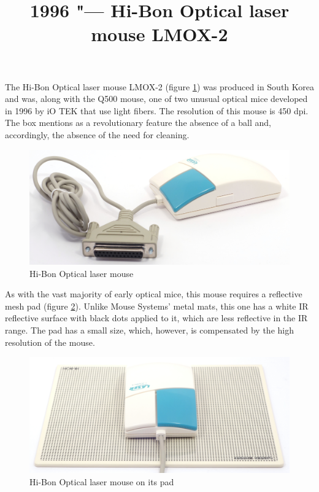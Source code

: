 \documentclass[11pt, a4paper]{article}
\begin{document}
\title{1996 "--- Hi-Bon Optical laser mouse LMOX-2}
\date{}
\maketitle
{}
The Hi-Bon Optical laser mouse LMOX-2 (figure \ref{fig:OpticalLaserMousePic}) was produced in South Korea and was, along with the Q500 mouse, one of two unusual optical mice developed in 1996 by iO TEK that use light fibers. The resolution of this mouse is 450 dpi. The box mentions as a revolutionary feature the absence of a ball and, accordingly, the absence of the need for cleaning.

\begin{figure}[h]
    \centering
    \includegraphics[scale=0.5]{1996_hi-bon_laser_mouse/pic_30.jpg}
    \caption{Hi-Bon Optical laser mouse}
    \label{fig:OpticalLaserMousePic}
\end{figure}

As with the vast majority of early optical mice, this mouse requires a reflective mesh pad (figure \ref{fig:OpticalLaserMousePad}). Unlike Mouse Systems' metal mats, this one has a white IR reflective surface with black dots applied to it, which are less reflective in the IR range. The pad has a small size, which, however, is compensated by the high resolution of the mouse.

\begin{figure}[h]
    \centering
    \includegraphics[scale=0.55]{1996_hi-bon_laser_mouse/pic2_30.jpg}
    \caption{Hi-Bon Optical laser mouse on its pad}
    \label{fig:OpticalLaserMousePad}
\end{figure}
\end{document}
